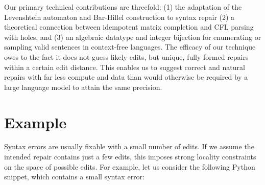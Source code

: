 \documentclass[sigplan,review,acmsmall,nonacm,anonymous]{acmart}\settopmatter{printfolios=false,printccs=false,printacmref=false}
\begin{document}
  \begin{figure}[h!]
    \begin{center}
    \end{center}
  \end{figure}

  Our primary technical contributions are threefold: (1) the adaptation of the Levenshtein automaton and Bar-Hillel construction to syntax repair (2) a theoretical connection between idempotent matrix completion and CFL parsing with holes, and (3) an algebraic datatype and integer bijection for enumerating or sampling valid sentences in context-free languages. The efficacy of our technique owes to the fact it does not guess likely edits, but unique, fully formed repairs within a certain edit distance. This enables us to suggest correct and natural repairs with far less compute and data than would otherwise be required by a large language model to attain the same precision.

  \section{Example}

  Syntax errors are usually fixable with a small number of edits. If we assume the intended repair contains just a few edits, this imposes strong locality constraints on the space of possible edits. For example, let us consider the following Python snippet, which contains a small syntax error:\\
\end{document}
